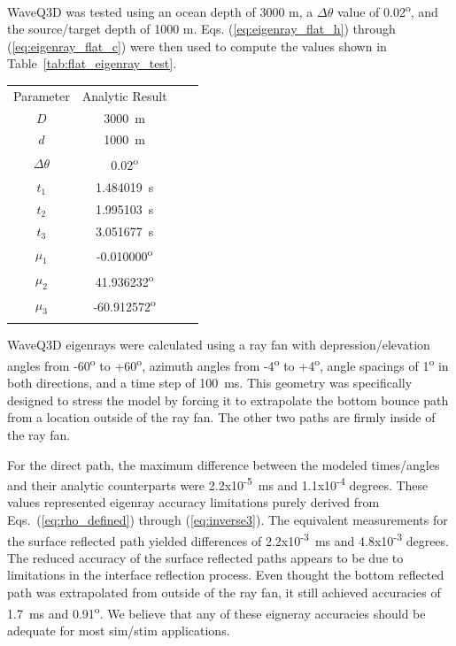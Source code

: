 \documentclass{ws-jca}
\begin{document}
WaveQ3D was tested using an ocean depth of 3000 m, a \( \Delta\theta \) value of 0.02\textsuperscript{o}, and the source/target depth of 1000 m.  Eqs. (\ref{eq:eigenray_flat_h}) through (\ref{eq:eigenray_flat_c}) were then used to compute the values shown in
Table~\ref{tab:flat_eigenray_test}.

\begin{table}[th]
	{\begin{tabular}{@{}cccc@{}} \toprule
		Parameter & Analytic Result \\ \colrule
		\( D \) & 3000~m \\
		\( d \) & 1000~m \\
		\( \Delta \theta \) & 0.02\textsuperscript{o} \\
		\( t_1 \) & 1.484019~s \\
		\( t_2 \) & 1.995103~s \\
		\( t_3 \) & 3.051677~s \\
		\( \mu_1 \) & -0.010000\textsuperscript{o} \\
		\( \mu_2 \) & 41.936232\textsuperscript{o} \\
		\( \mu_3 \) & -60.912572\textsuperscript{o} \\ \botrule
	\end{tabular}}
\end{table}

WaveQ3D eigenrays were calculated using a ray fan with
depression/elevation angles from -60\textsuperscript{o} to
+60\textsuperscript{o}, azimuth angles from -4\textsuperscript{o} to
+4\textsuperscript{o}, angle spacings of 1\textsuperscript{o} in both
directions, and a time step of 100~ms. This geometry was
specifically designed to stress the model by forcing it to extrapolate the
bottom bounce path from a location outside of the ray fan. The other two
paths are firmly inside of the ray fan.

For the direct path, the maximum difference between the modeled
times/angles and their analytic counterparts were
2.2x10\textsuperscript{-5}~ms and 1.1x10\textsuperscript{-4} degrees. These
values represented eigenray accuracy limitations purely derived from
Eqs.~(\ref{eq:rho_defined}) through (\ref{eq:inverse3}). The equivalent
measurements for the surface reflected path yielded differences of
2.2x10\textsuperscript{-3}~ms and 4.8x10\textsuperscript{-3} degrees. The
reduced accuracy of the surface reflected paths appears to be due to
limitations in the interface reflection process. Even thought the bottom
reflected path was extrapolated from outside of the ray fan, it still
achieved accuracies of 1.7~ms and 0.91\textsuperscript{o}. We believe that
any of these eigneray accuracies should be adequate for most sim/stim
applications.
\end{document}
